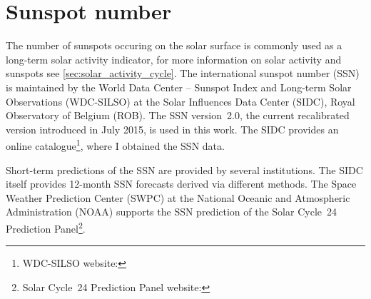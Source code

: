 \section{Sunspot number}
\label{sec:sunspot_number}
The number of sunspots occuring on the solar surface is commonly used as a long-term solar activity indicator, for more information on solar activity and sunspots see \autoref{sec:solar_activity_cycle}. The international sunspot number (SSN) is maintained by the World Data Center -- Sunspot Index and Long-term Solar Observations (WDC-SILSO) at the Solar Influences Data Center (SIDC), Royal Observatory of Belgium (ROB). The SSN version~2.0, the current recalibrated version introduced in July 2015, is used in this work. The SIDC provides an online catalogue\footnote{WDC-SILSO website: }, where I obtained the SSN data.

Short-term predictions of the SSN are provided by several institutions. The SIDC itself provides 12-month SSN forecasts derived via different methods. The Space Weather Prediction Center (SWPC) at the National Oceanic and Atmospheric Administration (NOAA) supports the SSN prediction of the Solar Cycle~24 Prediction Panel\footnote{Solar Cycle~24 Prediction Panel website: }.


